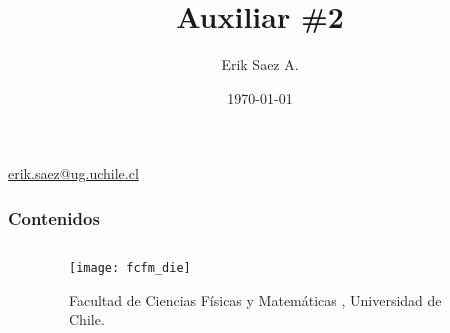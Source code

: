 \documentclass[
    10pt,
    aspectratio=169,
    xcolor={dvipsnames},
    spanish,
    ]{beamer}
\title[Auxiliar \#2 - Análisis de señales]{\bfseries Auxiliar \#2}
\subtitle{}
\author[Erik Saez A.]{Erik Saez A.}
\institute[UChile]{Department of Electrical Engineering \\ Universidad de Chile}
\date{\today}
\begin{document}
\begin{frame}
  \titlepage
  \centering
   \href{mailto:erik.saez@ug.uchile.cl}{erik.saez@ug.uchile.cl} \hspace{.2cm}
\end{frame}

\begin{frame}
  \frametitle{Contenidos}
  \centering
  \begin{columns}
    \begin{column}{0.4\textwidth}
      \tableofcontents
    \end{column}
    \begin{column}{0.5\textwidth}
      \begin{figure}
        \centering
        \texttt{[image: fcfm\_die]}
        \caption{Facultad de Ciencias Físicas y Matemáticas , Universidad de Chile.}
      \end{figure}
    \end{column}
  \end{columns}  
\end{frame}
\end{document}
